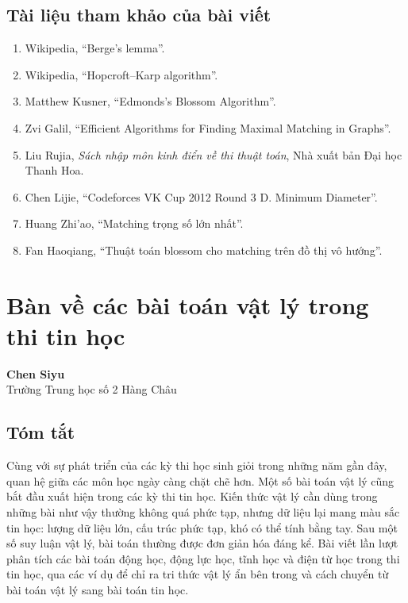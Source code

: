 \documentclass[11pt]{article}
\begin{document}
\subsection*{Tài liệu tham khảo của bài viết}

\begin{enumerate}
  \item Wikipedia, ``Berge's lemma''.
  \item Wikipedia, ``Hopcroft--Karp algorithm''.
  \item Matthew Kusner, ``Edmonds's Blossom Algorithm''.
  \item Zvi Galil, ``Efficient Algorithms for Finding Maximal Matching in
  Graphs''.
  \item Liu Rujia, \emph{Sách nhập môn kinh điển về thi thuật toán}, Nhà xuất
  bản Đại học Thanh Hoa.
  \item Chen Lijie, ``Codeforces VK Cup 2012 Round 3 D. Minimum Diameter''.
  \item Huang Zhi'ao, ``Matching trọng số lớn nhất''.
  \item Fan Haoqiang, ``Thuật toán blossom cho matching trên đồ thị vô hướng''.
\end{enumerate}

\section{Bàn về các bài toán vật lý trong thi tin học}

\begin{center}
\textbf{Chen Siyu}\\
Trường Trung học số 2 Hàng Châu
\end{center}

\subsection*{Tóm tắt}

Cùng với sự phát triển của các kỳ thi học sinh giỏi trong những năm gần đây,
quan hệ giữa các môn học ngày càng chặt chẽ hơn. Một số bài toán vật lý cũng
bắt đầu xuất hiện trong các kỳ thi tin học. Kiến thức vật lý cần dùng trong
những bài như vậy thường không quá phức tạp, nhưng dữ liệu lại mang màu sắc tin
học: lượng dữ liệu lớn, cấu trúc phức tạp, khó có thể tính bằng tay. Sau một số
suy luận vật lý, bài toán thường được đơn giản hóa đáng kể. Bài viết lần lượt
phân tích các bài toán động học, động lực học, tĩnh học và điện từ học trong
thi tin học, qua các ví dụ để chỉ ra tri thức vật lý ẩn bên trong và cách
chuyển từ bài toán vật lý sang bài toán tin học.
\end{document}
